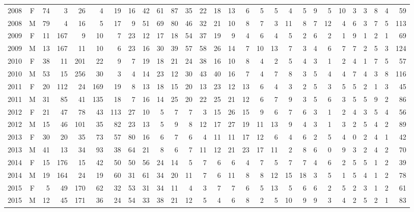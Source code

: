 \documentclass[
  english,
]{article}
\begin{document}
\begin{landscape}
\begin{longtable}{rcrrrrrrrrrrrrrrrrrrrrrrrrrr}
2008 & F & 74 & 3 & 26 & 4 & 19 & 16 & 42 & 61 & 87 & 35 & 22 & 18 & 13 & 6 & 5 & 5 & 4 & 5 & 9 & 5 & 10 & 3 & 3 & 8 & 4 & 59 \\ 
2008 & M & 79 & 4 & 16 & 5 & 17 & 9 & 51 & 69 & 80 & 46 & 32 & 21 & 10 & 8 & 7 & 3 & 11 & 8 & 7 & 12 & 4 & 6 & 3 & 7 & 5 & 113 \\ 
2009 & F & 11 & 167 & 9 & 10 & 7 & 23 & 12 & 17 & 18 & 54 & 37 & 19 & 9 & 4 & 6 & 4 & 5 & 2 & 6 & 2 & 1 & 9 & 1 & 2 & 1 & 69 \\ 
2009 & M & 13 & 167 & 11 & 10 & 6 & 23 & 16 & 30 & 39 & 57 & 58 & 26 & 14 & 7 & 10 & 13 & 7 & 3 & 4 & 6 & 7 & 7 & 2 & 5 & 3 & 124 \\ 
2010 & F & 38 & 11 & 201 & 22 & 9 & 7 & 19 & 18 & 21 & 24 & 38 & 16 & 10 & 8 & 4 & 2 & 5 & 4 & 3 & 1 & 2 & 4 & 1 & 7 & 5 & 57 \\ 
2010 & M & 53 & 15 & 256 & 30 & 3 & 4 & 14 & 23 & 12 & 30 & 43 & 40 & 16 & 7 & 4 & 7 & 8 & 3 & 5 & 4 & 4 & 7 & 4 & 3 & 8 & 116 \\ 
2011 & F & 20 & 112 & 24 & 169 & 19 & 8 & 13 & 18 & 15 & 20 & 13 & 23 & 12 & 13 & 6 & 4 & 3 & 2 & 5 & 3 & 5 & 5 & 2 & 1 & 3 & 45 \\ 
2011 & M & 31 & 85 & 41 & 135 & 18 & 7 & 16 & 14 & 25 & 20 & 22 & 25 & 21 & 12 & 6 & 7 & 9 & 3 & 5 & 6 & 3 & 5 & 5 & 9 & 2 & 86 \\ 
2012 & F & 21 & 47 & 78 & 43 & 113 & 27 & 10 & 5 & 7 & 7 & 3 & 15 & 26 & 15 & 9 & 6 & 7 & 6 & 3 & 1 & 2 & 4 & 3 & 5 & 4 & 56 \\ 
2012 & M & 15 & 46 & 101 & 35 & 82 & 23 & 13 & 5 & 9 & 8 & 12 & 17 & 27 & 19 & 11 & 13 & 9 & 4 & 3 & 1 & 3 & 2 & 5 & 4 & 2 & 89 \\ 
2013 & F & 30 & 20 & 35 & 73 & 57 & 80 & 16 & 6 & 7 & 6 & 4 & 11 & 11 & 17 & 12 & 6 & 4 & 6 & 2 & 5 & 4 & 0 & 2 & 4 & 1 & 42 \\ 
2013 & M & 41 & 13 & 34 & 93 & 38 & 64 & 21 & 8 & 6 & 7 & 11 & 12 & 21 & 23 & 17 & 11 & 2 & 8 & 6 & 0 & 9 & 3 & 2 & 4 & 2 & 70 \\ 
2014 & F & 15 & 176 & 15 & 42 & 50 & 50 & 56 & 24 & 14 & 5 & 7 & 6 & 6 & 4 & 7 & 5 & 7 & 7 & 4 & 6 & 2 & 5 & 5 & 1 & 2 & 39 \\ 
2014 & M & 19 & 164 & 24 & 19 & 60 & 31 & 61 & 34 & 20 & 11 & 7 & 6 & 11 & 8 & 8 & 12 & 15 & 18 & 3 & 5 & 1 & 5 & 4 & 1 & 2 & 78 \\ 
2015 & F & 5 & 49 & 170 & 62 & 32 & 53 & 31 & 34 & 11 & 4 & 3 & 7 & 7 & 6 & 5 & 13 & 5 & 6 & 6 & 2 & 5 & 2 & 3 & 1 & 2 & 61 \\ 
2015 & M & 12 & 45 & 171 & 36 & 24 & 54 & 33 & 38 & 21 & 12 & 5 & 4 & 6 & 8 & 2 & 5 & 10 & 9 & 9 & 3 & 4 & 2 & 5 & 2 & 1 & 83 \\ 

\end{longtable}
\end{landscape}
\end{document}
